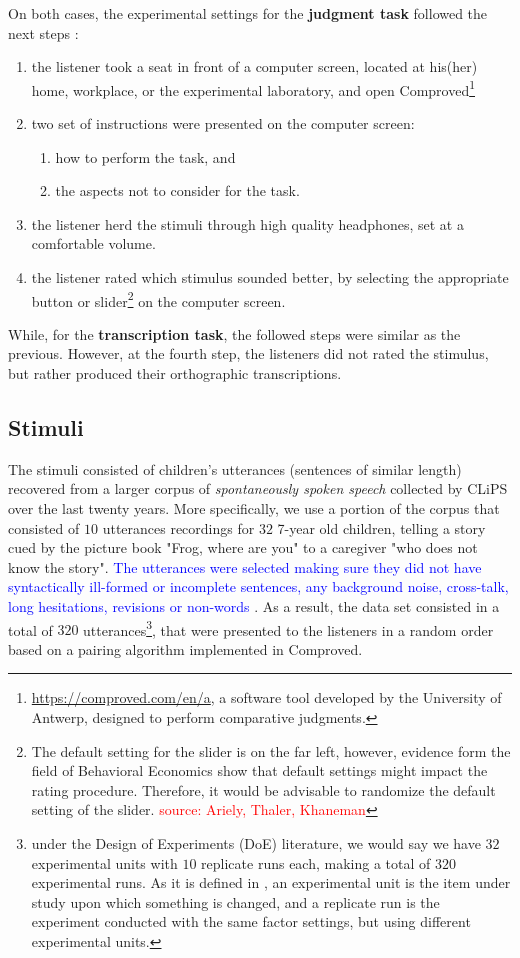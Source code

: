 On both cases, the experimental settings for the \textbf{judgment task} followed the next steps \citep{Boonen_et_al_2020, Boonen_et_al_2021}:
%
\begin{enumerate}
	\item the listener took a seat in front of a computer screen, located at his(her) home, workplace, or the experimental laboratory, and open Comproved\footnote{\url{https://comproved.com/en/a}, a software tool developed by the University of Antwerp, designed to perform comparative judgments.}
	\item two set of instructions were presented on the computer screen:
	\begin{enumerate}
		\item how to perform the task, and
		\item the aspects not to consider for the task.
	\end{enumerate}
	\item the listener herd the stimuli through high quality headphones, set at a comfortable volume.
	\item the listener rated which stimulus sounded better, by selecting the appropriate button or slider\footnote{The default setting for the slider is on the far left, however, evidence form the field of Behavioral Economics show that default settings might impact the rating procedure. Therefore, it would be advisable to randomize the default setting of the slider. \textcolor{red}{source: Ariely, Thaler, Khaneman}} on the computer screen.
\end{enumerate}
%
While, for the \textbf{transcription task}, the followed steps were similar as the previous. However, at the fourth step, the listeners did not rated the stimulus, but rather produced their orthographic transcriptions.
%
%
\subsection{Stimuli}
%
The stimuli consisted of children's utterances (sentences of similar length) recovered from a larger corpus of \textit{spontaneously spoken speech} collected by CLiPS over the last twenty years. More specifically, we use a portion of the corpus that consisted of $10$ utterances recordings for $32$ 7-year old children, telling a story cued by the picture book "Frog, where are you" \citep{Mayer_1969} to a caregiver "who does not know the story". \textcolor{blue}{The utterances were selected making sure they did not have syntactically ill-formed or incomplete sentences, any background noise, cross-talk, long hesitations, revisions or non-words \citep{Boonen_et_al_2021}}. As a result, the data set consisted in a total of $320$ utterances\footnote{under the Design of Experiments (DoE) literature, we would say we have $32$ experimental units with $10$ replicate runs each, making a total of $320$ experimental runs. As it is defined in \citet{Lawson_2015}, an experimental unit is the item under study upon which something is changed, and a replicate run is the experiment conducted with the same factor settings, but using different experimental units.}, that were presented to the listeners in a random order based on a pairing algorithm implemented in Comproved.

